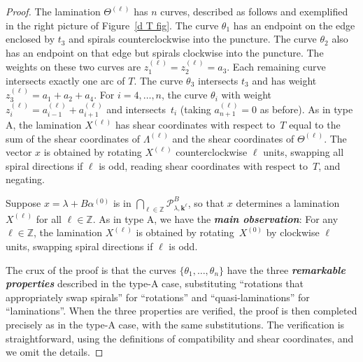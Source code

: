 \documentclass{amsart}
\theoremstyle{definition}
\theoremstyle{remark}
\numberwithin{equation}{section}
\newcommand{\newword}[1]{\textbf{\emph{#1}}}
\newcommand{\integers}{\mathbb Z}
\newcommand{\set}[1]{{\lbrace #1 \rbrace}}
\newcommand{\0}{{\mathbf{0}}}
\newcommand{\kk}{{\boldsymbol{k}}}
\renewcommand{\P}{\mathcal{P}}
\begin{document}
\begin{proof}
The lamination $\Theta^{(\ell)}$ has $n$ curves, described as follows and exemplified in the right picture of  Figure~\ref{d T fig}.
The curve $\theta_1$ has an endpoint on the edge enclosed by $t_3$ and spirals counterclockwise into the puncture.
The curve $\theta_2$ also has an endpoint on that edge but spirals clockwise into the puncture.
The weights on these two curves are $z_1^{(\ell)}=z_2^{(\ell)}=a_3$.
Each remaining curve intersects exactly one arc of $T$.
The curve $\theta_3$ intersects $t_3$ and has weight $z_3^{(\ell)}=a_1+a_2+a_4$.
For $i=4,\ldots,n$, the curve $\theta_i$ with weight $z_i^{(\ell)}=a_{i-1}^{(\ell)}+a_{i+1}^{(\ell)}$ and intersects~$t_i$ (taking $a_{n+1}^{(\ell)}=0$ as before).
As in type A, the lamination $X^{(\ell)}$ has shear coordinates with respect to~$T$ equal to the sum of the shear coordinates of $\Lambda^{(\ell)}$ and the shear coordinates of $\Theta^{(\ell)}$.
The vector $x$ is obtained by rotating $X^{(\ell)}$ counterclockwise $\ell$ units, swapping all spiral directions if $\ell$ is odd, reading shear coordinates with respect to~$T$, and negating.

Suppose $x=\lambda+B\alpha^{(0)}$ is in $\bigcap_{\ell\in\integers}\P^B_{\lambda,\kk^\ell}$, so that $x$ determines a lamination $X^{(\ell)}$ for all $\ell\in\integers$.
As in type A, we have the \newword{main observation}:
For any $\ell\in\integers$, the lamination $X^{(\ell)}$ is obtained by rotating~$X^{(0)}$ by clockwise $\ell$ units, swapping spiral directions if $\ell$ is odd.

The crux of the proof is that the curves $\set{\theta_1,\ldots,\theta_n}$ have the three \newword{remarkable properties} described in the type-A case, substituting ``rotations that appropriately swap spirals'' for ``rotations'' and ``quasi-laminations'' for ``laminations''.
When the three properties are verified, the proof is then completed precisely as in the type-A case, with the same substitutions.
The verification is straightforward, using the definitions of compatibility and shear coordinates, and we omit the details.


\end{proof}
\end{document}

